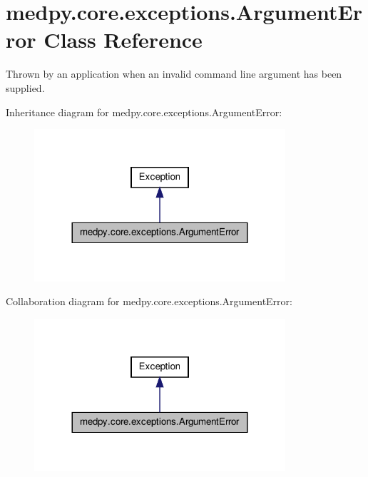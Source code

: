 \hypertarget{classmedpy_1_1core_1_1exceptions_1_1ArgumentError}{
\section{medpy.core.exceptions.ArgumentError Class Reference}
\label{classmedpy_1_1core_1_1exceptions_1_1ArgumentError}
}


Thrown by an application when an invalid command line argument has been supplied.  




Inheritance diagram for medpy.core.exceptions.ArgumentError:\nopagebreak
\begin{figure}[H]
\begin{center}
\leavevmode
\includegraphics[width=264pt]{classmedpy_1_1core_1_1exceptions_1_1ArgumentError__inherit__graph}
\end{center}
\end{figure}


Collaboration diagram for medpy.core.exceptions.ArgumentError:\nopagebreak
\begin{figure}[H]
\begin{center}
\leavevmode
\includegraphics[width=264pt]{classmedpy_1_1core_1_1exceptions_1_1ArgumentError__coll__graph}
\end{center}
\end{figure}


